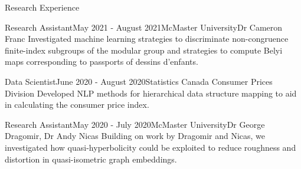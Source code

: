 \begin{rSection}{Research Experience}



\begin{rSubsection}{Research Assistant}{May 2021 - August 2021}{McMaster University}{Dr Cameron Franc}
	Investigated machine learning strategies to discriminate non-congruence finite-index subgroups of the modular group and strategies to compute Belyi maps corresponding to passports of dessins d'enfants.
\end{rSubsection}

\begin{rSubsection}{Data Scientist}{June 2020 - August 2020}{Statistics Canada }{Consumer Prices Division}
	Developed NLP methods for hierarchical data structure mapping to aid in calculating the consumer price index.
\end{rSubsection}


\begin{rSubsection}{Research Assistant}{May 2020 - July 2020}{McMaster University}{Dr George Dragomir, Dr Andy Nicas}
	Building on work by Dragomir and Nicas, we investigated how quasi-hyperbolicity could be exploited to reduce roughness and distortion in quasi-isometric graph embeddings.
\end{rSubsection}




\end{rSection}
